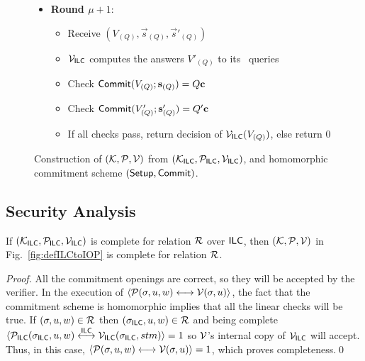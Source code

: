 \begin{figure}[!h]
{\begin{minipage}[t]{6.5cm}
\begin{algorithm}[H]
\begin{itemize}
\begin{itemize}
\end{itemize} 
\item\textbf{Round $\mu+1$}: 
\begin{itemize}
\item Receive $(V_{(Q)},\vec{s}_{(Q)},\vec{s}'_{(Q)})$
\item $\mathcal{V}_{\mathsf{ILC}}$ computes the answers $V'_{(Q)}$ to its \ILCcheck\ queries
\item Check $\mathsf{Commit}(V_{(Q)};\mathbf{s}_{(Q)})= Q \mathbf{c}$
\item Check $\mathsf{Commit}(V'_{(Q)};\mathbf{s}'_{(Q)})= Q' \mathbf{c}$
\item If all checks pass, return decision of $\mathcal{V}_{\mathsf{ILC}}(V_{(Q)})$, else return 0
\end{itemize}
\end{itemize}
\end{algorithm}
\end{minipage}}
\caption{Construction of $(\mathcal{K},\mathcal{P},\mathcal{V})$ from $(\mathcal{K}_{\mathsf{ILC}},\mathcal{P}_{\mathsf{ILC}},\mathcal{V}_{\mathsf{ILC}})$, and homomorphic commitment scheme $(\mathsf{Setup},\mathsf{Commit})$.}
\label{fig:defILCtoIOP2}
\end{figure}

\subsection{Security Analysis}
\label{sec:IPCPsec2}
    \begin{theorem}[Completeness]
    If $(\mathcal{K}_{\mathsf{ILC}},\mathcal{P}_{\mathsf{ILC}},\mathcal{V}_{\mathsf{ILC}})$ is complete for relation $\mathcal{R}$ over $\mathsf{ILC}$, then $(\mathcal{K},\mathcal{P},\mathcal{V})$ in Fig.~\ref{fig:defILCtoIOP} is complete for relation $\mathcal{R}$.
    \end{theorem}  
   \begin{proof}
All the commitment openings are correct, so they will be accepted by the verifier. In the execution of $\langle \mathcal{P}(\mathsf{\sigma},u,w)\longleftrightarrow\mathcal{V}(\mathsf{\sigma},u)\rangle$, the fact that the commitment scheme is homomorphic implies that all the linear checks will be true. If $(\mathsf{\sigma},u,w)\in \mathcal{R}$ then $(\mathsf{\sigma}_{\mathsf{ILC}},u,w)\in \mathcal{R}$ and being complete $\langle \mathcal{P}_{\mathsf{ILC}}(\mathsf{\sigma}_{\mathsf{ILC}},u,w)\overset{\mathsf{ILC}}{\longleftrightarrow}\mathcal{V}_{\mathsf{ILC}}(\mathsf{\sigma}_{\mathsf{ILC}},stm)\rangle =1$ so $\mathcal{V}$'s internal copy of $\mathcal{V}_{\mathsf{ILC}}$ will accept. Thus, in this case, $\langle \mathcal{P}(\mathsf{\sigma},u,w)\longleftrightarrow\mathcal{V}(\mathsf{\sigma},u)\rangle=1$, which proves completeness.\qed
    \end{proof}

